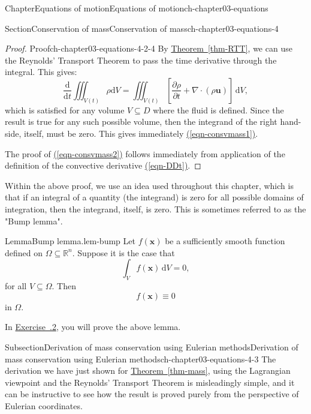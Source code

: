 \documentclass[oneside,10pt,]{book}
\newcommand{\xreffont}{\relax}
\numberwithin{equation}{section}
\newcommand{\de}{\mathrm{d}}
\newcommand{\dd}[2]{\frac{\de#1}{\de#2}}
\newcommand{\pd}[2]{\frac{\partial#1}{\partial#2}}
\newcommand{\bx}{\boldsymbol{x}}
\newcommand{\bu}{\boldsymbol{u}}
\begin{document}
\begin{chapterptx}{Chapter}{Equations of motion}{}{Equations of motion}{}{}{ch-chapter03-equations}
\begin{sectionptx}{Section}{Conservation of mass}{}{Conservation of mass}{}{}{ch-chapter03-equations-4}
\begin{introduction}{}
\begin{proof}{Proof}{}{ch-chapter03-equations-4-2-4}
By \hyperref[thm-RTT]{Theorem~{\xreffont\ref{thm-RTT}}}, we can use the Reynolds' Transport Theorem to pass the time derivative through the integral. This gives:%
\begin{equation*}
\dd{}{t}\iiint_{V(t)} \rho \de{V} = \iiint_{V(t)} \left[ \pd{\rho}{t} + \nabla \cdot (\rho \bu)\right] \, \de{V},
\end{equation*}
which is satisfied for any volume \(V \subseteq D\) where the fluid is defined. Since the result is true for any such possible volume, then the integrand of the right hand-side, itself, must be zero. This gives immediately \hyperref[eqn-consvmass1]{({\xreffont\ref{eqn-consvmass1}})}.%
\par
The proof of \hyperref[eqn-consvmass2]{({\xreffont\ref{eqn-consvmass2}})} follows immediately from application of the definition of the convective derivative \hyperref[eqn-DDt]{({\xreffont\ref{eqn-DDt}})}.%
\end{proof}
Within the above proof, we use an idea used throughout this chapter, which is that if an integral of a quantity (the integrand) is zero for all possible domains of integration, then the integrand, itself, is zero. This is sometimes referred to as the "Bump lemma".%
\begin{lemma}{Lemma}{Bump lemma.}{}{lem-bump}%
Let \(f(\bx)\) be a sufficiently smooth function defined on \(\Omega \subseteq \mathbb{R}^n\). Suppose it is the case that%
\begin{equation*}
\int_V f(\bx) \, \de{V} = 0,
\end{equation*}
for all \(V \subseteq \Omega\). Then%
\begin{equation*}
f(\bx) \equiv 0
\end{equation*}
in \(\Omega\).%
\end{lemma}
In \hyperlink{ex-bump}{Exercise~{\xreffont 3.6.2}}, you will prove the above lemma.%
\end{introduction}%
%
%
\typeout{************************************************}
\typeout{************************************************}
%
\begin{subsectionptx}{Subsection}{Derivation of mass conservation using Eulerian methods}{}{Derivation of mass conservation using Eulerian methods}{}{}{ch-chapter03-equations-4-3}
The derivation we have just shown for \hyperref[thm-mass]{Theorem~{\xreffont\ref{thm-mass}}}, using the Lagrangian viewpoint and the Reynolds' Transport Theorem is misleadingly simple, and it can be instructive to see how the result is proved purely from the perspective of Eulerian coordinates.%

\end{subsectionptx}
\end{sectionptx}
\end{chapterptx}
\end{document}
